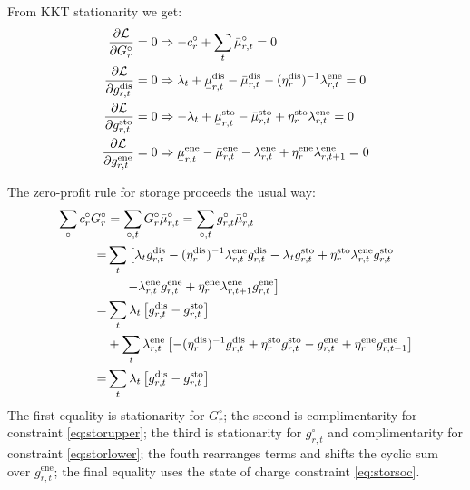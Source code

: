 \documentclass[final,3p,times]{elsarticle}
\newcommand{\ubar}[1]{\text{\b{$#1$}}}
\def\l{\lambda}
\def\m{\mu}
\def\d{\partial}
\def\cL{\mathcal{L}}
\begin{document}
From KKT stationarity we get:
\begin{align}
\frac{\d \cL}{\d G^\circ_{r}} = 0 &\Rightarrow - c^\circ_r + \sum_t \bar{\m}^\circ_{r,t}  = 0 \\
    \frac{\d \cL}{\d g^{\textrm{dis}}_{r,t}} = 0 &\Rightarrow  \l_t + \ubar{\m}^{\textrm{dis}}_{r,t} - \bar{\m}^{\textrm{dis}}_{r,t} - (\eta^{\textrm{dis}}_r)^{-1} \l^{\textrm{ene}}_{r,t}  = 0 \\
    \frac{\d \cL}{\d g^{\textrm{sto}}_{r,t}} = 0 &\Rightarrow  -\l_t + \ubar{\m}^{\textrm{sto}}_{r,t} - \bar{\m}^{\textrm{sto}}_{r,t} + \eta^{\textrm{sto}}_r \l^{\textrm{ene}}_{r,t}  = 0 \\
    \frac{\d \cL}{\d g^{\textrm{ene}}_{r,t}} = 0 &\Rightarrow   \ubar{\m}^{\textrm{ene}}_{r,t} - \bar{\m}^{\textrm{ene}}_{r,t} -  \l^{\textrm{ene}}_{r,t} + \eta^{\textrm{ene}}_r \l^{\textrm{ene}}_{r,t+1}   = 0
\end{align}

The zero-profit rule for storage proceeds the usual way:
\begin{align}
  \sum_\circ c^\circ_r G^\circ_r & =  \sum_{\circ,t} G^\circ_r\bar{\m}^\circ_{r,t}  =   \sum_{\circ,t} g^\circ_{r,t}\bar{\m}^\circ_{r,t} \nonumber \\
   = & \sum_t \left[ \l_t g^{\textrm{dis}}_{r,t} -(\eta^{\textrm{dis}}_r)^{-1} \l^{\textrm{ene}}_{r,t}  g^{\textrm{dis}}_{r,t}
  -\l_t g^{\textrm{sto}}_{r,t} + \eta^{\textrm{sto}}_r \l^{\textrm{ene}}_{r,t} g^{\textrm{sto}}_{r,t} \right.\nonumber \\
  & \left. \hspace{.5cm}-\l^{\textrm{ene}}_{r,t}g^{\textrm{ene}}_{r,t} + \eta^{\textrm{ene}}_r \l^{\textrm{ene}}_{r,t+1}g^{\textrm{ene}}_{r,t} \right] \nonumber \\
   = & \sum_t \l_t \left[ g^{\textrm{dis}}_{r,t} - g^{\textrm{sto}}_{r,t}  \right] \nonumber \\
   & + \sum_t  \l^{\textrm{ene}}_{r,t} \left[ -(\eta^{\textrm{dis}}_r)^{-1} g^{\textrm{dis}}_{r,t}+ \eta^{\textrm{sto}}_r  g^{\textrm{sto}}_{r,t} -g^{\textrm{ene}}_{r,t} + \eta^{\textrm{ene}}_r g^{\textrm{ene}}_{r,t-1} \right] \nonumber \\
      = & \sum_t \l_t \left[ g^{\textrm{dis}}_{r,t} - g^{\textrm{sto}}_{r,t}  \right]
\end{align}
The first equality is stationarity for $G^\circ_r$; the second is complimentarity for constraint \eqref{eq:storupper}; the third is stationarity for $g^\circ_{r,t}$ and complimentarity for constraint \eqref{eq:storlower}; the fouth rearranges terms and shifts the cyclic sum over $g^{\textrm{ene}}_{r,t}$; the final equality uses the state of charge constraint \eqref{eq:storsoc}.
\end{document}

